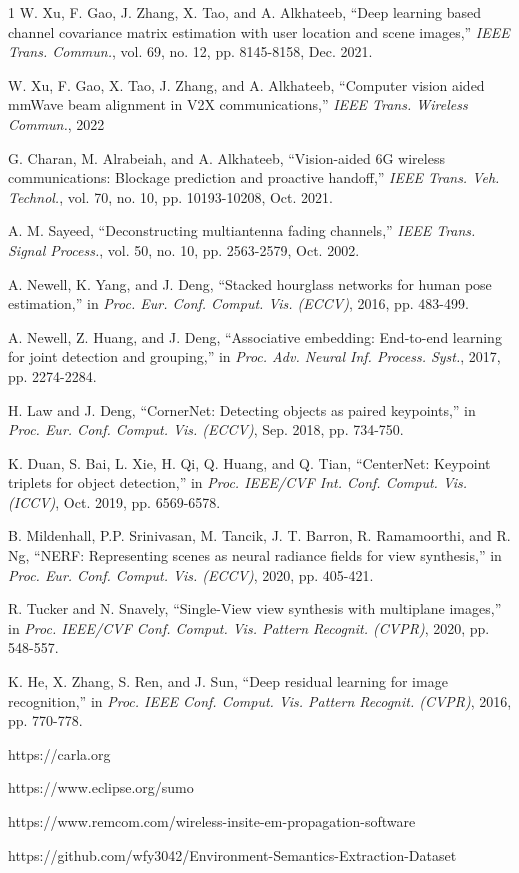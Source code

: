\documentclass[lettersize,journal]{IEEEtran}
\begin{document}
\begin{thebibliography}{1}
W. Xu, F. Gao, J. Zhang, X. Tao, and A. Alkhateeb, ``Deep learning based channel covariance matrix estimation with user location and scene images,'' \textit{IEEE Trans. Commun.}, vol. 69, no. 12, pp. 8145-8158, Dec. 2021.

W. Xu, F. Gao, X. Tao, J. Zhang, and A. Alkhateeb, ``Computer vision aided mmWave beam alignment in V2X communications,'' \textit{IEEE Trans. Wireless Commun.}, 2022

G. Charan, M. Alrabeiah, and A. Alkhateeb, ``Vision-aided 6G wireless communications: Blockage prediction and proactive handoff,'' \textit{IEEE Trans. Veh. Technol.}, vol. 70, no. 10, pp. 10193-10208, Oct. 2021.

A. M. Sayeed, ``Deconstructing multiantenna fading channels,'' \textit{IEEE Trans. Signal Process.}, vol. 50, no. 10, pp. 2563-2579, Oct. 2002.

A. Newell, K. Yang, and J. Deng, ``Stacked hourglass networks for human pose estimation,'' in \textit{Proc. Eur. Conf. Comput. Vis. (ECCV)}, 2016, pp. 483-499.

A. Newell, Z. Huang, and J. Deng, ``Associative embedding: End-to-end learning for joint detection and grouping,'' in \textit{Proc. Adv. Neural Inf. Process. Syst.}, 2017, pp. 2274-2284.

H. Law and J. Deng, ``CornerNet: Detecting objects as paired keypoints,'' in \textit{Proc. Eur. Conf. Comput. Vis. (ECCV)}, Sep. 2018, pp. 734-750.

K. Duan, S. Bai, L. Xie, H. Qi, Q. Huang, and Q. Tian, ``CenterNet: Keypoint triplets for object detection,'' in \textit{Proc. IEEE/CVF Int. Conf. Comput. Vis. (ICCV)}, Oct. 2019, pp. 6569-6578.

B. Mildenhall, P.P. Srinivasan, M. Tancik, J. T. Barron, R. Ramamoorthi, and R. Ng, ``NERF: Representing scenes as neural radiance fields for view synthesis,'' in \textit{Proc. Eur. Conf. Comput. Vis. (ECCV)}, 2020, pp. 405-421.

R. Tucker and N. Snavely, ``Single-View view synthesis with multiplane images,'' in \textit{Proc. IEEE/CVF Conf. Comput. Vis. Pattern Recognit. (CVPR)}, 2020, pp. 548-557.

K. He, X. Zhang, S. Ren, and J. Sun, ``Deep residual learning for image recognition,'' in \textit{Proc. IEEE Conf. Comput. Vis. Pattern Recognit. (CVPR)}, 2016, pp. 770-778.

https://carla.org

https://www.eclipse.org/sumo

https://www.remcom.com/wireless-insite-em-propagation-software

https://github.com/wfy3042/Environment-Semantics-Extraction-Dataset

\end{thebibliography}


\vfill
\end{document}
